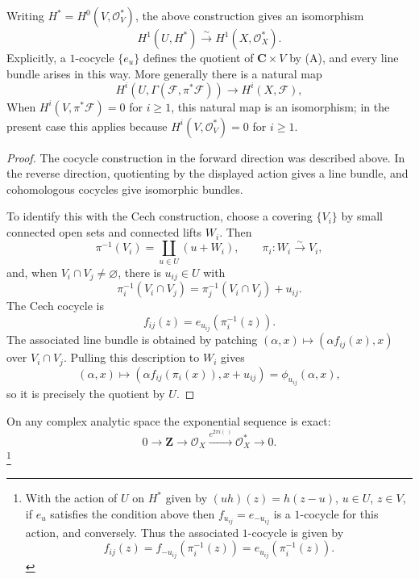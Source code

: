 \begin{theorem}
\label{mumford-frag-factors}
Writing $H^*=H^0(V,\mathcal O_V^*)$, the above construction gives an
isomorphism
\[
 H^1(U,H^*)\xrightarrow{\sim}H^1(X,\mathcal O_X^*).
\]
Explicitly, a $1$-cocycle $\{e_u\}$ defines the quotient of
$\mathbf C\times V$ by (A), and every line bundle arises in this way.
More generally there is a natural map
\[
 H^i(U,\Gamma(\mathcal F,\pi^*\mathcal F))\longrightarrow H^i(X,\mathcal F),
\]
When $H^i(V,\pi^*\mathcal F)=0$ for $i\ge1$, this natural map is an
isomorphism; in the present case this applies because
$H^i(V,\mathcal O_V^*)=0$ for $i\ge1$.
\end{theorem}
\begin{proof}
The cocycle construction in the forward direction was described above.  In
the reverse direction, quotienting by the displayed action gives a line
bundle, and cohomologous cocycles give isomorphic bundles.

To identify this with the Cech construction, choose a covering $\{V_i\}$ by
small connected open sets and connected lifts $W_i$.  Then
\[
 \pi^{-1}(V_i)=\coprod_{u\in U}(u+W_i),\qquad
 \pi_i:W_i\xrightarrow{\sim}V_i,
\]
and, when $V_i\cap V_j\ne\varnothing$, there is $u_{ij}\in U$ with
\[
 \pi_i^{-1}(V_i\cap V_j)=\pi_j^{-1}(V_i\cap V_j)+u_{ij}.
\]
The Cech cocycle is
\[
 f_{ij}(z)=e_{u_{ij}}(\pi_i^{-1}(z)).
\]
The associated line bundle is obtained by patching
$(\alpha,x)\mapsto(\alpha f_{ij}(x),x)$ over $V_i\cap V_j$.  Pulling this
description to $W_i$ gives
\[
 (\alpha,x)\longmapsto
 (\alpha f_{ij}(\pi_i(x)),x+u_{ij})=\phi_{u_{ij}}(\alpha,x),
\]
so it is precisely the quotient by $U$.
\end{proof}


On any complex analytic space the exponential sequence is exact:
\[
 0\longrightarrow\mathbf Z\longrightarrow\mathcal O_X
 \xrightarrow{e^{2\pi i(\ )}}\mathcal O_X^*\longrightarrow0.
\]
\footnote{With the action of $U$ on $H^*$ given by $(uh)(z)=h(z-u)$,
$u\in U$, $z\in V$, if $e_u$ satisfies the condition above then
$f_{u_{ij}}=e_{-u_{ij}}$ is a $1$-cocycle for this action, and conversely.
Thus the associated $1$-cocycle is given by
\[
 f_{ij}(z)=f_{-u_{ij}}(\pi_i^{-1}(z))
 =e_{u_{ij}}(\pi_i^{-1}(z)).
\]}
